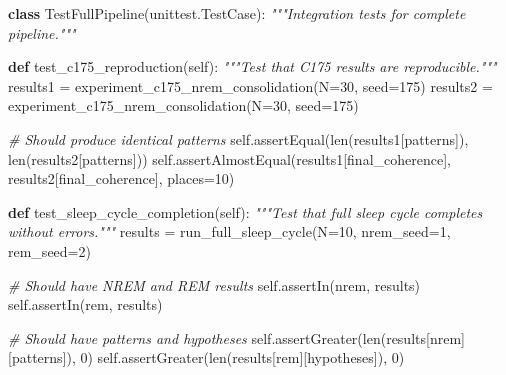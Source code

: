 \documentclass[
]{article}
\newenvironment{Shaded}{}{}
\newcommand{\BuiltInTok}[1]{\textcolor[rgb]{0.00,0.50,0.00}{#1}}
\newcommand{\CommentTok}[1]{\textcolor[rgb]{0.38,0.63,0.69}{\textit{#1}}}
\newcommand{\DecValTok}[1]{\textcolor[rgb]{0.25,0.63,0.44}{#1}}
\newcommand{\KeywordTok}[1]{\textcolor[rgb]{0.00,0.44,0.13}{\textbf{#1}}}
\newcommand{\NormalTok}[1]{#1}
\newcommand{\OperatorTok}[1]{\textcolor[rgb]{0.40,0.40,0.40}{#1}}
\newcommand{\StringTok}[1]{\textcolor[rgb]{0.25,0.44,0.63}{#1}}
\newcommand{\VariableTok}[1]{\textcolor[rgb]{0.10,0.09,0.49}{#1}}
\begin{document}
\begin{Shaded}
\begin{Highlighting}[]
\KeywordTok{class}\NormalTok{ TestFullPipeline(unittest.TestCase):}
    \CommentTok{"""Integration tests for complete pipeline."""}

    \KeywordTok{def}\NormalTok{ test\_c175\_reproduction(}\VariableTok{self}\NormalTok{):}
        \CommentTok{"""Test that C175 results are reproducible."""}
\NormalTok{        results1 }\OperatorTok{=}\NormalTok{ experiment\_c175\_nrem\_consolidation(N}\OperatorTok{=}\DecValTok{30}\NormalTok{, seed}\OperatorTok{=}\DecValTok{175}\NormalTok{)}
\NormalTok{        results2 }\OperatorTok{=}\NormalTok{ experiment\_c175\_nrem\_consolidation(N}\OperatorTok{=}\DecValTok{30}\NormalTok{, seed}\OperatorTok{=}\DecValTok{175}\NormalTok{)}

        \CommentTok{\# Should produce identical patterns}
        \VariableTok{self}\NormalTok{.assertEqual(}\BuiltInTok{len}\NormalTok{(results1[}\StringTok{\textquotesingle{}patterns\textquotesingle{}}\NormalTok{]), }\BuiltInTok{len}\NormalTok{(results2[}\StringTok{\textquotesingle{}patterns\textquotesingle{}}\NormalTok{]))}
        \VariableTok{self}\NormalTok{.assertAlmostEqual(results1[}\StringTok{\textquotesingle{}final\_coherence\textquotesingle{}}\NormalTok{],}
\NormalTok{                              results2[}\StringTok{\textquotesingle{}final\_coherence\textquotesingle{}}\NormalTok{], places}\OperatorTok{=}\DecValTok{10}\NormalTok{)}

    \KeywordTok{def}\NormalTok{ test\_sleep\_cycle\_completion(}\VariableTok{self}\NormalTok{):}
        \CommentTok{"""Test that full sleep cycle completes without errors."""}
\NormalTok{        results }\OperatorTok{=}\NormalTok{ run\_full\_sleep\_cycle(N}\OperatorTok{=}\DecValTok{10}\NormalTok{, nrem\_seed}\OperatorTok{=}\DecValTok{1}\NormalTok{, rem\_seed}\OperatorTok{=}\DecValTok{2}\NormalTok{)}

        \CommentTok{\# Should have NREM and REM results}
        \VariableTok{self}\NormalTok{.assertIn(}\StringTok{\textquotesingle{}nrem\textquotesingle{}}\NormalTok{, results)}
        \VariableTok{self}\NormalTok{.assertIn(}\StringTok{\textquotesingle{}rem\textquotesingle{}}\NormalTok{, results)}

        \CommentTok{\# Should have patterns and hypotheses}
        \VariableTok{self}\NormalTok{.assertGreater(}\BuiltInTok{len}\NormalTok{(results[}\StringTok{\textquotesingle{}nrem\textquotesingle{}}\NormalTok{][}\StringTok{\textquotesingle{}patterns\textquotesingle{}}\NormalTok{]), }\DecValTok{0}\NormalTok{)}
        \VariableTok{self}\NormalTok{.assertGreater(}\BuiltInTok{len}\NormalTok{(results[}\StringTok{\textquotesingle{}rem\textquotesingle{}}\NormalTok{][}\StringTok{\textquotesingle{}hypotheses\textquotesingle{}}\NormalTok{]), }\DecValTok{0}\NormalTok{)}
\end{Highlighting}
\end{Shaded}
\end{document}
